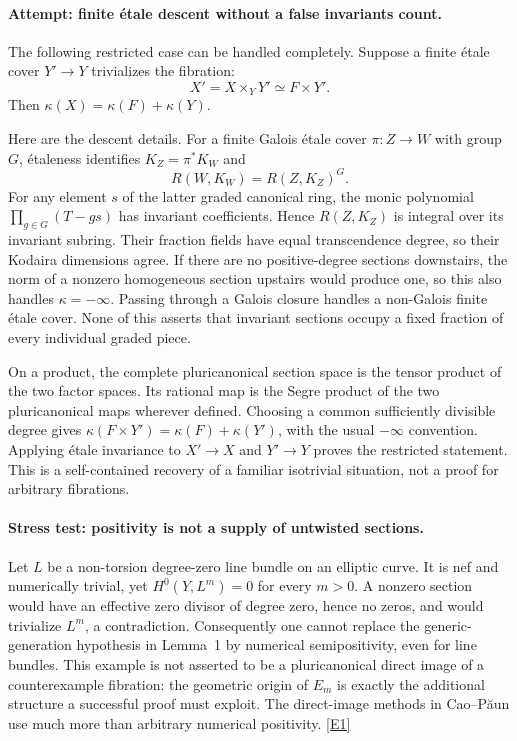 \documentclass[11pt,a4paper]{article}
\newcommand{\eref}[2]{\hyperlink{extra:#1:#2}{[E#2]}}
\numberwithin{equation}{section}
\begin{document}
\paragraph{Attempt: finite \'etale descent without a false invariants count.}
The following restricted case can be handled completely. Suppose a finite
\'etale cover $Y'\to Y$ trivializes the fibration:
\[
 X'=X\times_Y Y'\simeq F\times Y'.
\]
Then $\kappa(X)=\kappa(F)+\kappa(Y)$.

Here are the descent details. For a finite Galois \'etale cover
$\pi:Z\to W$ with group $G$, \'etaleness identifies $K_Z=\pi^*K_W$ and
\[
 R(W,K_W)=R(Z,K_Z)^G.
\]
For any element $s$ of the latter graded canonical ring, the monic
polynomial $\prod_{g\in G}(T-gs)$ has invariant coefficients. Hence
$R(Z,K_Z)$ is integral over its invariant subring. Their fraction fields
have equal transcendence degree, so their Kodaira dimensions agree.
If there are no positive-degree sections downstairs, the norm of a
nonzero homogeneous section upstairs would produce one, so this also
handles $\kappa=-\infty$. Passing through a Galois closure handles a
non-Galois finite \'etale cover. None of this asserts that invariant
sections occupy a fixed fraction of every individual graded piece.

On a product, the complete pluricanonical section space is the tensor
product of the two factor spaces. Its rational map is the Segre product
of the two pluricanonical maps wherever defined. Choosing a common
sufficiently divisible degree gives
$\kappa(F\times Y')=\kappa(F)+\kappa(Y')$, with the usual $-\infty$
convention. Applying \'etale invariance to $X'\to X$ and $Y'\to Y$ proves
the restricted statement. This is a self-contained recovery of a familiar
isotrivial situation, not a proof for arbitrary fibrations.

\paragraph{Stress test: positivity is not a supply of untwisted sections.}
Let $L$ be a non-torsion degree-zero line bundle on an elliptic curve.
It is nef and numerically trivial, yet $H^0(Y,L^m)=0$ for every $m>0$.
A nonzero section would have an effective zero divisor of degree zero,
hence no zeros, and would trivialize $L^m$, a contradiction. Consequently
one cannot replace the generic-generation hypothesis in Lemma~1 by
numerical semipositivity, even for line bundles. This example is not
asserted to be a pluricanonical direct image of a counterexample fibration:
the geometric origin of $E_m$ is exactly the additional structure a
successful proof must exploit. The direct-image methods in
Cao--P\u{a}un use much more than arbitrary numerical positivity.
\eref{30005168}{1}
\end{document}
